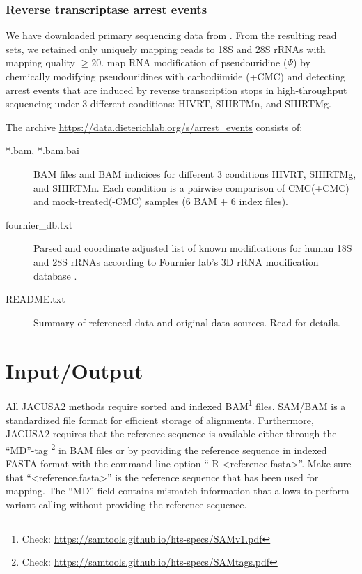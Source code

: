 \documentclass[10pt,a4paper,final]{article}
\begin{document}
\subsubsection{Reverse transcriptase arrest events}\label{sec:zhou2018_data}
We have downloaded primary sequencing data from \cite{Zhou2018}.
From the resulting read sets, we retained only uniquely mapping reads to 18S and 28S rRNAs with 
mapping quality $\ge 20$.
\cite{Zhou2018} map RNA modification of pseudouridine ($\Psi$) by chemically modifying
pseudouridines with carbodiimide (+CMC) and detecting arrest events that are induced by reverse
transcription stops in high-throughput sequencing under 3 different conditions: HIVRT, SIIIRTMn, and
SIIIRTMg.

The archive \url{https://data.dieterichlab.org/s/arrest_events} consists of:
\begin{description}
  \item[*.bam, *.bam.bai] BAM files and BAM indicices for different 3 conditions HIVRT, SIIIRTMg,
  and SIIIRTMn. Each condition is a pairwise comparison of CMC(+CMC) and mock-treated(-CMC) samples 
  (6 BAM + 6 index files).
  \item[fournier\_db.txt] Parsed and coordinate adjusted list of known modifications for human 18S
  and 28S rRNAs according to Fournier lab's 3D rRNA modification database \cite{PieknaPrzybylska2007}.
  \item[README.txt] Summary of referenced data and original data sources. Read for details.
\end{description}
\section{Input/Output}
All JACUSA2 methods require sorted and indexed BAM\footnote{Check: 
\url{https://samtools.github.io/hts-specs/SAMv1.pdf}} files.
SAM/BAM is a standardized file format for efficient storage of alignments.
Furthermore, JACUSA2 requires that the reference sequence is available either through the ``MD''-tag
\footnote{Check: \url{https://samtools.github.io/hts-specs/SAMtags.pdf}} in BAM files or by providing 
the reference sequence in indexed FASTA format with the command line option ``-R <reference.fasta>''.
Make sure that ``<reference.fasta>'' is the reference sequence that has been used for mapping. 
The ``MD'' field contains mismatch information that allows to perform variant calling without 
providing the reference sequence.
\end{document}
